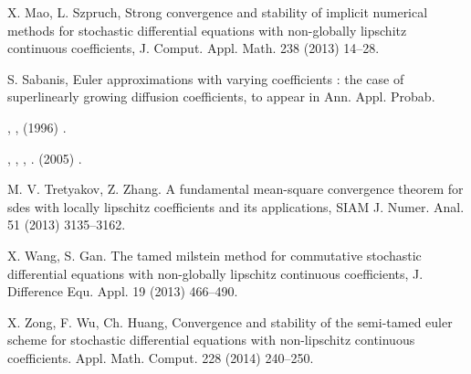 \begin{thebibliography}{26}
X. Mao, L. Szpruch,
\newblock Strong convergence and stability of implicit numerical methods for
  stochastic differential equations with non-globally lipschitz continuous
  coefficients,
\newblock J. Comput. Appl. Math.
  238 (2013) 14--28.
  
 

S. Sabanis,
\newblock Euler approximations with varying coefficients : the case of
  superlinearly growing diffusion coefficients,
\newblock to appear in Ann. Appl. Probab.

, 
\newblock {},
\newblock {}
   (1996) .

, ,
  , 
\newblock {}.
\newblock {}   (2005) .

M. V. Tretyakov, Z. Zhang.
\newblock A fundamental mean-square convergence theorem for sdes with locally
  lipschitz coefficients and its applications,
\newblock SIAM J. Numer. Anal. 51 (2013) 3135--3162.



X. Wang,  S. Gan.
\newblock The tamed milstein method for commutative stochastic differential
  equations with non-globally lipschitz continuous coefficients,
\newblock J. Difference Equ. Appl. 19 (2013) 466--490.


X. Zong, F. Wu, Ch. Huang,
\newblock Convergence and stability of the semi-tamed euler scheme for
  stochastic differential equations with non-lipschitz continuous coefficients.
\newblock Appl. Math. Comput. 228
  (2014)  240--250.


\end{thebibliography}
